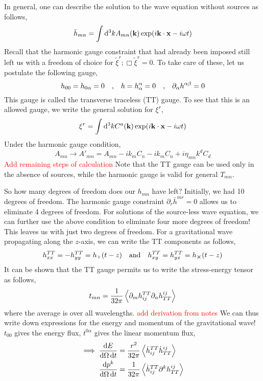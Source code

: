 \documentclass[a4paper,11pt]{article}
\begin{document}
In general, one can describe the solution to the wave equation without sources as follows,
\begin{equation*}
\bar{h}_{mn} = \int \dd^3{k} A_{mn}( \vb{k}) \exp(i \vb{k} \cdot \vb{x} - i \omega t)
\end{equation*}
Recall that the harmonic gauge constraint that had already been imposed still left us with a freedom of choice for $ \tilde{\xi}^r; \Box \tilde{\xi}^r =0 $. To take care of these, let us postulate the following gauge,
\begin{equation*}
h_{00} = h_{0\alpha} = 0 \qq{,} h = h^\alpha_\alpha = 0 \qq{,} \partial_\alpha h^{\alpha \beta} = 0
\end{equation*}
This gauge is called the transverse traceless (TT) gauge. To see that this is an allowed gauge, we write the general solution for $ \xi^r $,
\begin{equation*}
\xi^r = \int \dd^3{k} C^a(\vb{k}) \exp(i \vb{k} \cdot \vb{x} - i \omega t)
\end{equation*}
Under the harmonic gauge condition, 
\begin{equation*}
A_{mn} \rightarrow A'_{mn} = A_{mn} - ik_m C_n - i k_m C_n + i \eta_{mn} k^d C_d
\end{equation*}
\textcolor{red}{Add remaining steps of calculation}
Note that the TT gauge can be used only in the absence of sources, while the harmonic gauge is valid for general $ T_{mn} $.

So how many degrees of freedom does our $ h_{mn} $ have left? Initially, we had 10 degrees of freedom. The harmonic gauge constraint $ \partial_r \bar{h}^{mr} = 0 $ allows us to eliminate 4 degrees of freedom. For solutions of the source-less wave equation, we can further use the above condition to eliminate four more degrees of freedom! This leaves us with just two degrees of freedom. For a gravitational wave propagating along the $ z $-axis, we can write the TT components as follows,
\begin{equation*}
h_{xx}^{TT} = - h_{yy}^{TT} = h_+ (t-z) \qq{and} h_{xy}^{TT} = h_{yx}^{TT} = h_{\cross} (t-z)
\end{equation*}
It can be shown that the TT gauge permits us to write the stress-energy tensor as follows,
\begin{equation*}
t_{mn} = \dfrac{1}{32 \pi} \ev{\partial_m h^{TT}_{ij} \partial_n h^{ij}_{TT}}
\end{equation*}
where the average is over all wavelengths. \textcolor{red}{add derivation from notes}
We can thus write down expressions for the energy and momentum of the gravitational wave! $ t_{00} $ gives the energy flux, $ t^{0\alpha} $ gives the linear momentum flux, 
\begin{align*}
\implies \dfrac{\dd{E}}{\dd{\Omega} \dd{t}} &=  \dfrac{r^2}{32 \pi} \ev{ \dot{h}^{TT}_{ij} \dot{h}^{ij}_{TT}} \\
 \dfrac{\dd{p^k}}{\dd{\Omega} \dd{t}} &= \dfrac{1}{32 \pi} \ev{\dot{h}^{TT}_{ij} \partial^k h^{ij}_{TT}}
\end{align*}
\end{document}

